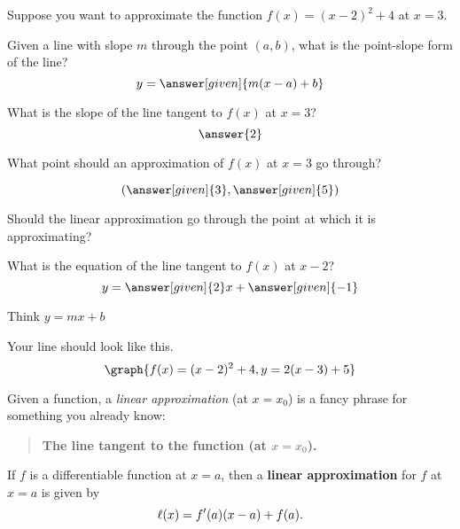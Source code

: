 \documentclass[handout,nooutcomes]{ximera}
\begin{document}
\begin{example}
Suppose you want to approximate the function $f(x) = (x-2)^2  + 4$ at $x=3$.

Given a line with slope $m$ through the point $(a, b)$, what is the point-slope form of the line?
\[
y = \answer[given]{m(x - a) + b}
\]

What is the slope of the line tangent to $f(x)$ at $x=3$?
\[
\answer{2}
\]

\begin{problem}
What point should an approximation of $f(x)$ at $x=3$ go through?

\[
(\answer[given]{3}, \answer[given]{5})
\]
\begin{hint}
Should the linear approximation go through the point at which it is approximating?
\end{hint}
\end{problem}

\begin{problem}
What is the equation of the line tangent to $f(x)$ at $x-2$?
\[
y = \answer[given]{2}x + \answer[given]{-1}
\]
\begin{hint}
Think $y=mx+b$
\end{hint}

\begin{feedback}
Your line should look like this.
\[
\graph{f(x) = (x-2)^2+4, y = 2(x-3) + 5}
\]
\end{feedback}
\end{problem}





Given a function, a \textit{linear approximation} (at $x=x_0$) is a fancy phrase
for something you already know:
\begin{center}
\begin{quote}
  \textbf{The line tangent to the function (at $x=x_0$).}
\end{quote}
\end{center}


\begin{definition}
If $f$ is a differentiable function at $x=a$, then a \textbf{linear
  approximation} for $f$ at $x=a$ is given by
\[
\ell(x) = f'(a)(x-a) +f(a).
\]
\end{definition}



\end{example}
\end{document}
